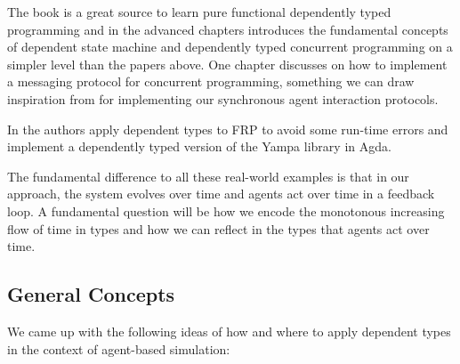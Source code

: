 The book \cite{brady_type-driven_2017} is a great source to learn pure functional dependently typed programming and in the advanced chapters introduces the fundamental concepts of dependent state machine and dependently typed concurrent programming on a simpler level than the papers above. One chapter discusses on how to implement a messaging protocol for concurrent programming, something we can draw inspiration from for implementing our synchronous agent interaction protocols.

In \cite{sculthorpe_safe_2009} the authors apply dependent types to FRP to avoid some run-time errors and implement a dependently typed version of the Yampa library in Agda.

The fundamental difference to all these real-world examples is that in our approach, the system evolves over time and agents act over time in a feedback loop. A fundamental question will be how we encode the monotonous increasing flow of time in types and how we can reflect in the types that agents act over time.



\subsection{General Concepts}
\label{sub:dep_abs_generalconcepts}

We came up with the following ideas of how and where to apply dependent types in the context of agent-based simulation:

